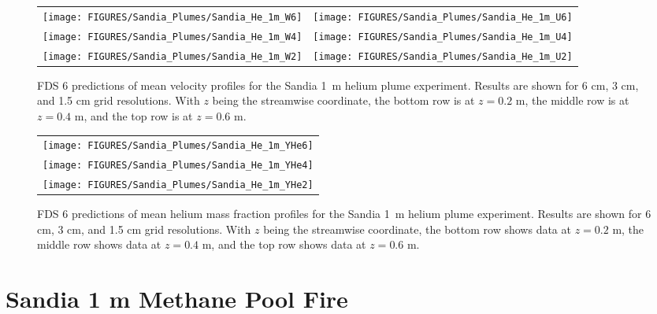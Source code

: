 \newpage

\begin{figure}[p]
\begin{tabular*}{\textwidth}{l@{\extracolsep{\fill}}r}
\texttt{[image: FIGURES/Sandia\_Plumes/Sandia\_He\_1m\_W6]} &
\texttt{[image: FIGURES/Sandia\_Plumes/Sandia\_He\_1m\_U6]} \\
\texttt{[image: FIGURES/Sandia\_Plumes/Sandia\_He\_1m\_W4]} &
\texttt{[image: FIGURES/Sandia\_Plumes/Sandia\_He\_1m\_U4]} \\
\texttt{[image: FIGURES/Sandia\_Plumes/Sandia\_He\_1m\_W2]} &
\texttt{[image: FIGURES/Sandia\_Plumes/Sandia\_He\_1m\_U2]}
\end{tabular*}
\caption[Sandia 1~m helium plume mean velocity profiles.]
{FDS 6 predictions of mean velocity profiles for the Sandia 1~m helium plume experiment. Results are shown for 6 cm, 3 cm, and 1.5 cm grid resolutions. With $z$ being the streamwise coordinate, the bottom row is at $z=0.2$ m, the middle row is at $z=0.4$ m, and the top row is at $z=0.6$ m.}
\label{Sandia_He_1m_velocity}
\end{figure}


\begin{figure}[p]
\begin{center}
\begin{tabular}{c}
\texttt{[image: FIGURES/Sandia\_Plumes/Sandia\_He\_1m\_YHe6]} \\
\texttt{[image: FIGURES/Sandia\_Plumes/Sandia\_He\_1m\_YHe4]} \\
\texttt{[image: FIGURES/Sandia\_Plumes/Sandia\_He\_1m\_YHe2]}
\end{tabular}
\end{center}
\caption[Sandia 1~m helium plume mean mass fraction profiles.]
{FDS 6 predictions of mean helium mass fraction profiles for the Sandia 1~m helium plume experiment. Results are shown for 6 cm, 3 cm, and 1.5 cm grid resolutions. With $z$ being the streamwise coordinate, the bottom row shows data at $z=0.2$ m, the middle row shows data at $z=0.4$ m, and the top row shows data at $z=0.6$ m.}
\label{Sandia_He_1m_massfraction}
\end{figure}

\clearpage

\section{Sandia 1 m Methane Pool Fire}
\label{Sandia_methane}

